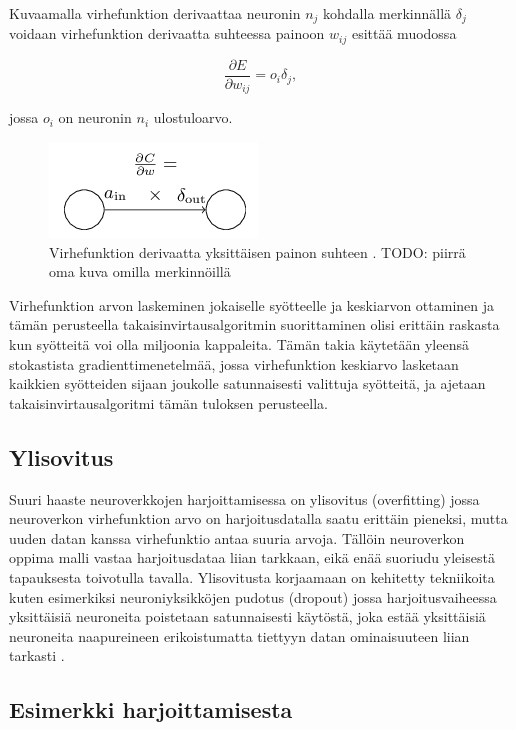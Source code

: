 \documentclass[finnish]{tktltiki2}
\theoremstyle{definition}
\theoremstyle{remark}
\begin{document}
  Kuvaamalla virhefunktion derivaattaa neuronin $n_j$ kohdalla merkinnällä $\delta_j$ voidaan virhefunktion derivaatta suhteessa painoon $w_{ij}$ esittää muodossa 

    $$ \frac{\partial E}{\partial w_{ij}} = o_i\delta_j,$$

  jossa $o_i$ on neuronin $n_i$ ulostuloarvo.

  \begin{figure}[h]
    \centering
    \includegraphics[scale=0.8]{cost-derivative}
    \caption{Virhefunktion derivaatta yksittäisen painon suhteen \cite{Nielsen-neural}. TODO: piirrä oma kuva omilla merkinnöillä}
    \label{pic:cost-weight-derivative}
  \end{figure}

  Virhefunktion arvon laskeminen jokaiselle syötteelle ja keskiarvon ottaminen ja tämän perusteella takaisinvirtausalgoritmin suorittaminen olisi erittäin raskasta kun syötteitä voi olla miljoonia kappaleita. Tämän takia käytetään yleensä stokastista gradienttimenetelmää, jossa virhefunktion keskiarvo lasketaan kaikkien syötteiden sijaan joukolle satunnaisesti valittuja syötteitä, ja ajetaan takaisinvirtausalgoritmi tämän tuloksen perusteella.

  \subsection{Ylisovitus}

  Suuri haaste neuroverkkojen harjoittamisessa on ylisovitus (overfitting) jossa neuroverkon virhefunktion arvo on harjoitusdatalla saatu erittäin pieneksi, mutta uuden datan kanssa virhefunktio antaa suuria arvoja. Tällöin neuroverkon oppima malli vastaa harjoitusdataa liian tarkkaan, eikä enää suoriudu yleisestä tapauksesta toivotulla tavalla. Ylisovitusta korjaamaan on kehitetty tekniikoita kuten esimerkiksi neuroniyksikköjen pudotus (dropout) jossa harjoitusvaiheessa yksittäisiä neuroneita poistetaan satunnaisesti käytöstä, joka estää yksittäisiä neuroneita naapureineen erikoistumatta tiettyyn datan ominaisuuteen liian tarkasti \cite{dropout-srivastava}.
% 

  \subsection{Esimerkki harjoittamisesta}
\end{document}
